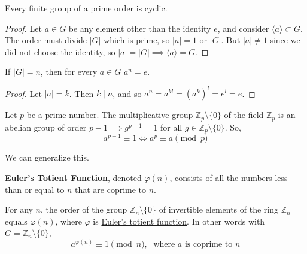   \begin{corollary}
    \label{thm:groups-of-prime-order-are-cyclic}
    Every finite group of a prime order is cyclic. 
  \end{corollary}
  \begin{proof}
    Let $a \in G$ be any element other than the identity $e$, and consider $\langle a \rangle \subset G$. The order must divide $|G|$ which is prime, so $|a| = 1$ or $|G|$. But $|a| \neq 1$ since we did not choose the identity, so $|a| = |G| \implies \langle a \rangle = G$. 
  \end{proof}

  \begin{corollary}[$a^{|G|} = e$ for Every Element]
    \label{thm:age-for-every-element}
    If $|G| = n$, then for every $a \in G$ $a^n = e$. 
  \end{corollary}
  \begin{proof}
    Let $|a| = k$. Then $k \mid n$, and so $a^n = a^{kl} = (a^k)^l = e^l = e$. 
  \end{proof}

  \begin{corollary}
    \label{thm:fermats-little-theorem}
    Let $p$ be a prime number. The multiplicative group $\mathbb{Z}_{p} \setminus \{0\}$ of the field $\mathbb{Z}_{p}$ is an abelian group of order $p-1 \implies g^{p-1} = 1$ for all $g \in \mathbb{Z}_{p} \setminus \{0\}$. So,
    \begin{equation}
      a^{p-1} \equiv 1 \iff a^{p} \equiv a \pmod{p}
    \end{equation}
  \end{corollary} 

  We can generalize this. 

  \begin{definition}
    \label{def:eulers-totient-function}
    \textbf{Euler's Totient Function}, denoted $\varphi(n)$, consists of all the numbers less than or equal to $n$ that are coprime to $n$. 
  \end{definition}

  \begin{theorem}
    \label{thm:eulers-theorem}
    For any $n$, the order of the group $\mathbb{Z}_{n} \setminus \{0\}$ of invertible elements of the ring $\mathbb{Z}_{n}$ equals $\varphi(n)$, where $\varphi$ is \hyperref[def:eulers-totient-function]{Euler's totient function}. In other words with $G = \mathbb{Z}_{n} \setminus \{0\}$, 
    \begin{equation}
      a^{\varphi(n)} \equiv 1 \pmod{n}, \; \text{ where $a$ is coprime to $n$}
    \end{equation}
  \end{theorem}

